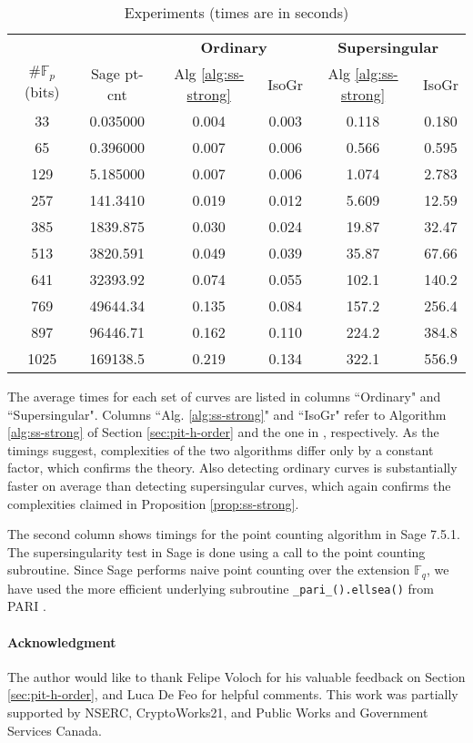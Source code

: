 \documentclass[11pt]{article}
\theoremstyle{plain}
\theoremstyle{definition}
\def\F{\ensuremath{\mathbb{F}}}
\begin{document}
\begin{table}
	\centering
	\small
	\begin{tabular}{cccccc}
		& & \multicolumn{2}{c}{\bfseries Ordinary} & \multicolumn{2}{c}{\bfseries Supersingular} \\
		\cmidrule[0.7pt](r){3-4} \cmidrule[0.7pt](l){5-6} 
		$\#\F_p$ (bits) & Sage pt-cnt & Alg \ref{alg:ss-strong} & IsoGr & Alg 
		\ref{alg:ss-strong} & IsoGr \\
		\midrule[0.7pt]
		33 & 0.035000 & 0.004 & 0.003 & 0.118 & 0.180 \\
		65 & 0.396000 &  0.007 & 0.006 & 0.566 & 0.595 \\
		129 & 5.185000 &  0.007 & 0.006 & 1.074 & 2.783 \\
		257 & 141.3410 &  0.019 & 0.012 & 5.609 & 12.59 \\
		385 & 1839.875 &  0.030 & 0.024 & 19.87 & 32.47 \\
		513 & 3820.591 &  0.049 & 0.039 & 35.87 & 67.66 \\
		641 & 32393.92 &  0.074 & 0.055 & 102.1 & 140.2 \\
		769 & 49644.34 &  0.135 & 0.084 & 157.2 & 256.4 \\
		897 & 96446.71 &  0.162 & 0.110 & 224.2 & 384.8 \\
		1025 & 169138.5 &  0.219 & 0.134 & 322.1 & 556.9 \\		
		\midrule[0.7pt]
	\end{tabular}
	\caption{Experiments (times are in seconds)}
	\label{table:exper}
\end{table}

The average times for each set of curves are listed in columns ``Ordinary" and ``Supersingular". 
Columns ``Alg. \ref{alg:ss-strong}" and ``IsoGr" refer to Algorithm \ref{alg:ss-strong} of Section 
\ref{sec:pit-h-order} and the one in \cite{sutherland2012}, respectively. As the timings suggest, 
complexities of the two algorithms differ only by a constant factor, which confirms the theory. 
Also detecting ordinary curves is substantially faster on average than detecting supersingular 
curves, which again confirms the complexities claimed in Proposition \ref{prop:ss-strong}. 

The second column shows timings for the point counting algorithm in Sage 7.5.1. The 
supersingularity test in Sage is done using a call to the point counting subroutine. Since Sage 
performs naive point counting over the extension $\F_q$, we have used the more efficient underlying 
subroutine \verb|_pari_().ellsea()| from PARI \cite{Pari}. 

\paragraph{Acknowledgment}
The author would like to thank Felipe Voloch for his valuable feedback on Section 
\ref{sec:pit-h-order}, and Luca De Feo for helpful comments. This work was partially supported by 
NSERC, CryptoWorks21, and Public Works and Government Services Canada.






\end{document}
